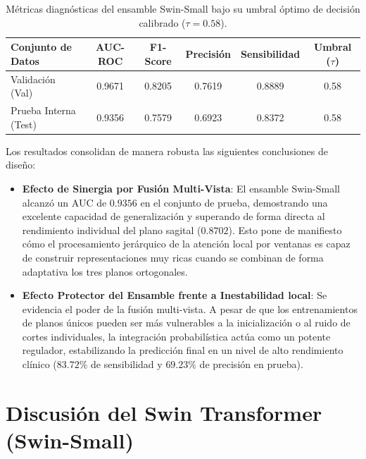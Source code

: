 \begin{table}[htbp]
\centering
\caption{Métricas diagnósticas del ensamble Swin-Small bajo su umbral óptimo de decisión calibrado ($\tau = 0.58$).}
\label{tab:ensemble_swin}
\begin{tabular}{lccccc}
\hline
\textbf{Conjunto de Datos} & \textbf{AUC-ROC} & \textbf{F1-Score} & \textbf{Precisión} & \textbf{Sensibilidad} & \textbf{Umbral ($\tau$)} \\ \hline
Validación (Val)           & 0.9671           & 0.8205            & 0.7619             & 0.8889                & 0.58                     \\
Prueba Interna (Test)      & 0.9356           & 0.7579            & 0.6923             & 0.8372                & 0.58                     \\ \hline
\end{tabular}
\end{table}

Los resultados consolidan de manera robusta las siguientes conclusiones de diseño:
\begin{itemize}
    \item \textbf{Efecto de Sinergia por Fusión Multi-Vista}: El ensamble Swin-Small alcanzó un AUC de $0.9356$ en el conjunto de prueba, demostrando una excelente capacidad de generalización y superando de forma directa al rendimiento individual del plano sagital ($0.8702$). Esto pone de manifiesto cómo el procesamiento jerárquico de la atención local por ventanas es capaz de construir representaciones muy ricas cuando se combinan de forma adaptativa los tres planos ortogonales.
    \item \textbf{Efecto Protector del Ensamble frente a Inestabilidad local}: Se evidencia el poder de la fusión multi-vista. A pesar de que los entrenamientos de planos únicos pueden ser más vulnerables a la inicialización o al ruido de cortes individuales, la integración probabilística actúa como un potente regulador, estabilizando la predicción final en un nivel de alto rendimiento clínico ($83.72\%$ de sensibilidad y $69.23\%$ de precisión en prueba).
\end{itemize}

\section{Discusión del Swin Transformer (Swin-Small)}
\label{sec:discusion_swin}

